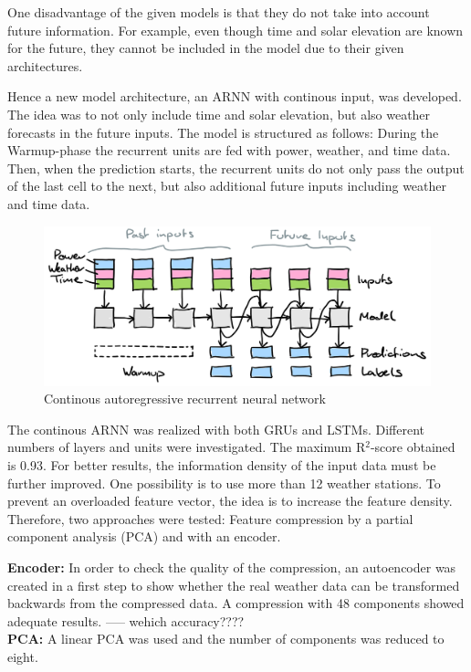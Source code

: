 \documentclass[11pt,table]{article}
\begin{document}
One disadvantage of the given models is that they do not take into account future information. For example, even though time and solar elevation are known for the future, they cannot be included in the model due to their given architectures.

Hence a new model architecture, an ARNN with continous input, was developed. The idea was to not only include time and solar elevation, but also weather forecasts in the future inputs. The model is structured as follows: During the Warmup-phase the recurrent units are fed with power, weather, and time data. Then, when the prediction starts, the recurrent units do not only pass the output of the last cell to the next, but also additional future inputs including weather and time data.
 
\begin{figure}[H]
	\centering
	\includegraphics[scale=1]{Figures/continousARNN.png}
	\caption{Continous autoregressive recurrent neural network}
	\label{fig:continousARNN}
\end{figure}

The continous ARNN was realized with both GRUs and LSTMs. Different numbers of layers and units were investigated. The maximum R$^2$-score obtained is 0.93. For better results, the information density of the input data must be further improved. One possibility is to use more than 12 weather stations. To prevent an overloaded feature vector, the idea is to increase the feature density. Therefore, two approaches were tested: Feature compression by a partial component analysis (PCA) and with an encoder.

\textbf{Encoder:}
In order to check the quality of the compression, an autoencoder was created in a first step to show whether the real weather data can be transformed backwards from the compressed data. A compression with 48 components showed adequate results. ----- wehich accuracy????\\

\textbf{PCA:}
A linear PCA was used and the number of components was reduced to eight.\\
\end{document}
